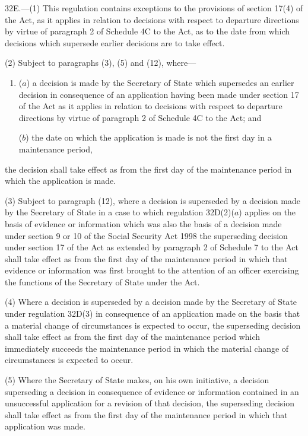 \documentclass[12pt,a4paper]{article}
\begin{document}
32E.—(1) This regulation contains exceptions to the provisions of section 17(4) of the Act, as it applies in relation to decisions with respect to departure directions by virtue of paragraph 2 of Schedule 4C to the Act, as to the date from which decisions which supersede earlier decisions are to take effect.

(2) Subject to paragraphs 
(3), (5) and (12),  %
where---
\begin{enumerate}\item[]
($a$) a decision is made by the Secretary of State which supersedes an earlier decision in consequence of an application having been made under section 17 of the Act as it applies in relation to decisions with respect to departure directions by virtue of paragraph 2 of Schedule 4C to the Act; and

($b$) the date on which the application is made is not the first day in a maintenance period, 
\end{enumerate}
the decision shall take effect as from the first day of the maintenance period in which the application is made.

(3) 
Subject to paragraph (12), where a decision  %
is superseded by a decision made by the Secretary of State in a case to which regulation 32D(2)($a$) applies on the basis of evidence or information which was also the basis of a decision made under section 9 or 10 of the Social Security Act 1998 the superseding decision under section 17 of the Act as extended by paragraph 2 of Schedule 7 to the Act shall take effect as from the first day of the maintenance period in which that evidence or information was first brought to the attention of an officer exercising the functions of the Secretary of State under the Act.

(4) Where a decision is superseded by a decision made by the Secretary of State under regulation 32D(3) in consequence of an application made on the basis that a material change of circumstances is expected to occur, the superseding decision shall take effect as from the first day of the maintenance period which immediately succeeds the maintenance period in which the material change of circumstances is expected to occur.

(5) Where the Secretary of State makes, on his own initiative, a decision superseding a decision in consequence of evidence or information contained in an unsuccessful application for a revision of that decision, the superseding decision shall take effect as from the first day of the maintenance period in which that application was made.
\end{document}
